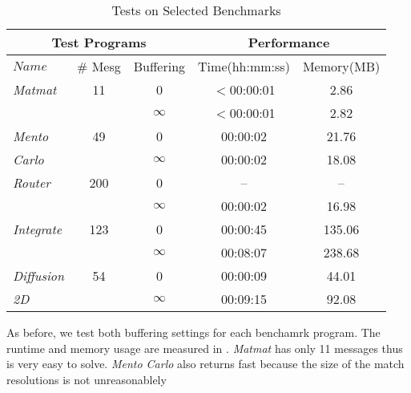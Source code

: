 \begin{table}[t]
\begin{center}
\scriptsize
\caption{Tests on Selected Benchmarks}\label{table:benchmarks}
\begin{tabular}{|l|c|c|c|c|}
		\hline
         \multicolumn{3}{|c|}{Test Programs} & \multicolumn{2}{|c|}{Performance} \\ \hline
          $Name$&\# Mesg&Buffering&Time(hh:mm:ss)&Memory(MB) \\ \hline
           \textit{Matmat} & 11 & 0 & $<$00:00:01 & 2.86\\
          	      & &  $\infty$ & $<$00:00:01 & 2.82\\ \hline
	 \textit{Mento} & 49 & 0 & 00:00:02 & 21.76\\
          \textit{Carlo}    & & $\infty$ & 00:00:02 & 18.08 \\ \hline
	 \textit{Router}   & 200 & 0 & -- & --\\
          	      & & $\infty$ & 00:00:02 & 16.98 \\ \hline
	 \textit{Integrate}  & 123 & 0 & 00:00:45 & 135.06 \\
          	      & & $\infty$ & 00:08:07 & 238.68\\ \hline
	  \textit{Diffusion}  & 54 & 0 & 00:00:09 & 44.01 \\
           \textit{2D} &  & $\infty$ & 00:09:15 & 92.08\\ \hline          
          		\end{tabular}
\end{center}
\end{table}

As before, we test both buffering settings for each benchamrk program. The runtime and memory usage are  measured in . \textit{Matmat} has only 11 messages thus is very easy to solve. \textit{Mento Carlo} also returns fast because the size of the match resolutions is not unreasonablely 


